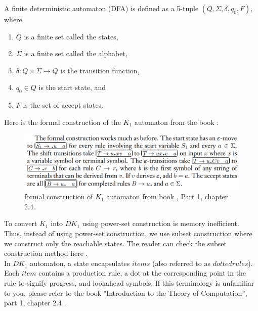 \begin{definition}[2.0]
    A finite deterministic automaton (DFA) is defined as a 5-tuple  \((Q, \Sigma, \delta, q_{0}, F)\), where
    \begin{enumerate}
        \item \(Q\) is a finite set called the states,
        \item \(\Sigma\) is a finite set called the alphabet,
        \item \(\delta : Q \times \Sigma \to Q\) is the transition function,
        \item \(q_{0} \in Q\) is the start state, and
        \item \(F\) is the set of accept states.
    \end{enumerate}
\end{definition}
\setlength{\parindent}{0pt}

\vspace{10pt}

Here is the formal construction of the \( K_{1}\) automaton from the book \cite{sipser}:


\begin{figure}[h!]
    \includegraphics[width=\linewidth]{DK1 formal specification.png}
    \caption{formal construction of \(K_{1}\) automaton from book \cite{sipser}, Part 1, chapter 2.4.}
    \label{2}
\end{figure}

\vspace{15pt}

To convert \(K_{1}\) into \(DK_{1}\) using power-set construction is memory inefficient. Thus, instead of using power-set construction, we use subset construction where we construct only the reachable states. The reader can check the subset construction method here \cite{DFA}.\\

In \( DK_{1} \) automaton, a state encapsulates \(items\) (also referred to as \(dotted rules\)). Each \(item\) contains a production rule, a dot at the corresponding point in the rule to signify progress, and lookahead symbols. If this terminology is unfamiliar to you, please refer to the book "Introduction to the Theory of Computation”, part 1, chapter 2.4 \cite{sipser}.\\

